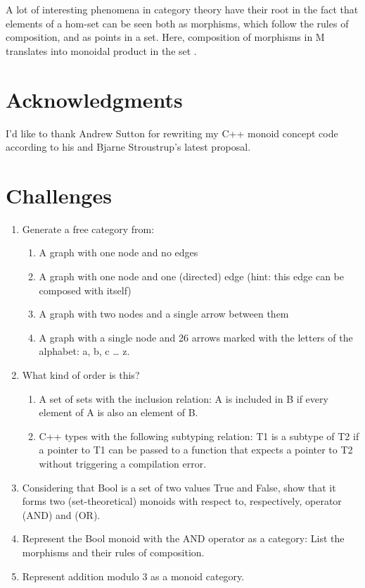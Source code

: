 A lot of interesting phenomena in category theory have their root in the
fact that elements of a hom-set can be seen both as morphisms, which
follow the rules of composition, and as points in a set. Here,
composition of morphisms in M translates into monoidal product in the
set .

\section{Acknowledgments}\label{acknowledgments}

I'd like to thank Andrew Sutton for rewriting my C++ monoid concept code
according to his and Bjarne Stroustrup's latest proposal.

\section{Challenges}\label{challenges}

\begin{enumerate}
\tightlist
\item
  Generate a free category from:

  \begin{enumerate}
  \tightlist
  \item
    A graph with one node and no edges
  \item
    A graph with one node and one (directed) edge (hint: this edge can
    be composed with itself)
  \item
    A graph with two nodes and a single arrow between them
  \item
    A graph with a single node and 26 arrows marked with the letters of
    the alphabet: a, b, c \ldots{} z.
  \end{enumerate}
\item
  What kind of order is this?

  \begin{enumerate}
  \tightlist
  \item
    A set of sets with the inclusion relation: A is included in B if
    every element of A is also an element of B.
  \item
    C++ types with the following subtyping relation: T1 is a subtype of
    T2 if a pointer to T1 can be passed to a function that expects a
    pointer to T2 without triggering a compilation error.
  \end{enumerate}
\item
  Considering that Bool is a set of two values True and False, show that
  it forms two (set-theoretical) monoids with respect to, respectively,
  operator \code{\&\&} (AND) and \code{\textbar{}\textbar{}} (OR).
\item
  Represent the Bool monoid with the AND operator as a category: List
  the morphisms and their rules of composition.
\item
  Represent addition modulo 3 as a monoid category.
\end{enumerate}